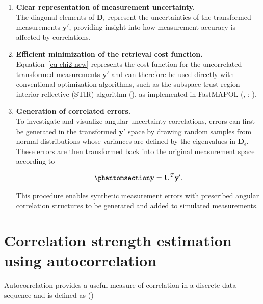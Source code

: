 \documentclass[
  11pt,
  letterpaper,
]{scrreprt}
\begin{document}
\begin{enumerate}
\def\labelenumi{\arabic{enumi}.}
\item
  \textbf{Clear representation of measurement uncertainty.}\\
  The diagonal elements of \(\mathbf{D}_{\epsilon}\) represent the
  uncertainties of the transformed measurements \(\mathbf{y}'\),
  providing insight into how measurement accuracy is affected by
  correlations.
\item
  \textbf{Efficient minimization of the retrieval cost function.}\\
  Equation~\ref{eq-chi2-new} represents the cost function for the
  uncorrelated transformed measurements \(\mathbf{y}'\) and can
  therefore be used directly with conventional optimization algorithms,
  such as the subspace trust-region interior-reflective (STIR) algorithm
  (), as implemented in
  FastMAPOL (,
  ; ).
\item
  \textbf{Generation of correlated errors.}\\
  To investigate and visualize angular uncertainty correlations, errors
  can first be generated in the transformed \(\mathbf{y}'\) space by
  drawing random samples from normal distributions whose variances are
  defined by the eigenvalues in \(\mathbf{D}_{\epsilon}\). These errors
  are then transformed back into the original measurement space
  according to

  \begin{equation}\phantomsection\label{eq-y-inverse-transform}{
  \mathbf{y}
  =
  \mathbf{U}^{T}\mathbf{y}'.
  }\end{equation}

  This procedure enables synthetic measurement errors with prescribed
  angular correlation structures to be generated and added to simulated
  measurements.
\end{enumerate}

\section{Correlation strength estimation using
autocorrelation}\label{sec-ac}

Autocorrelation provides a useful measure of correlation in a discrete
data sequence and is defined as
()
\end{document}
